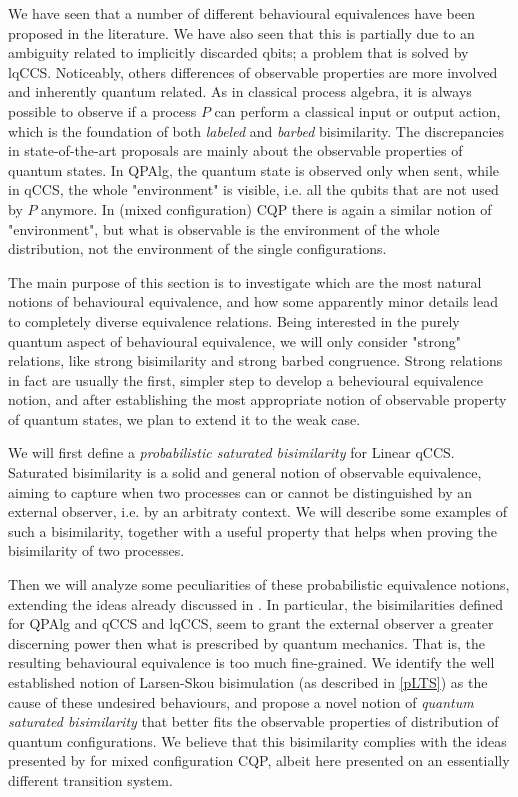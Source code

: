 We have seen that a number of different behavioural equivalences have been proposed in the literature. We have also seen that this is partially due to an ambiguity related to implicitly discarded qbits; a problem that is solved by  lqCCS. Noticeably, others  differences of observable properties are more involved and inherently quantum related. As in classical process algebra, it is always possible to observe if a process $P$ can perform a classical input or output action, which is the foundation of both \textit{labeled} and \textit{barbed} bisimilarity. The discrepancies in state-of-the-art proposals are mainly about the observable properties of quantum states. In QPAlg, the quantum state is observed only when sent, while in qCCS, the whole "environment" is visible, i.e. all the qubits that are not used by $P$ anymore. In (mixed configuration) CQP there is again a similar notion of "environment", but what is observable is the environment of the whole distribution, not the environment of the single configurations.

The main purpose of this section is to investigate which are the most natural notions of behavioural equivalence, and how some apparently minor details lead to completely diverse equivalence relations. Being interested in the purely quantum aspect of behavioural equivalence, we will only consider "strong" relations, like strong bisimilarity and strong barbed congruence. Strong relations in fact are usually the first, simpler step to develop a behevioural equivalence notion, and after establishing the most appropriate notion of observable property of quantum states, we plan to extend it to the weak case.

We will first define a \textit{probabilistic saturated bisimilarity} \cite{bonchiGeneralTheoryBarbs2014} for Linear qCCS. Saturated bisimilarity is a solid and general notion of observable equivalence, aiming to capture when two processes can or cannot be distinguished by an external observer, i.e. by an arbitraty context. We will describe some examples of such a bisimilarity, together with a useful property that helps when proving the bisimilarity of two processes.

Then we will analyze some peculiarities of these probabilistic equivalence notions, extending the ideas already discussed in \cite{davidsonFormalVerificationTechniques2012}. In particular, the bisimilarities defined for QPAlg and qCCS and lqCCS, seem to grant the external observer a greater discerning power then what is prescribed by quantum mechanics. That is, the resulting behavioural equivalence is too much  fine-grained. We identify the well established notion of Larsen-Skou bisimulation (as described in \ref{pLTS}) as the cause of these undesired behaviours, and propose a novel notion of \textit{quantum saturated bisimilarity} that better fits the observable properties of distribution of quantum configurations. We believe that this bisimilarity complies with the ideas presented by \cite{davidsonFormalVerificationTechniques2012} for mixed configuration CQP, albeit here presented on an essentially different transition system.

